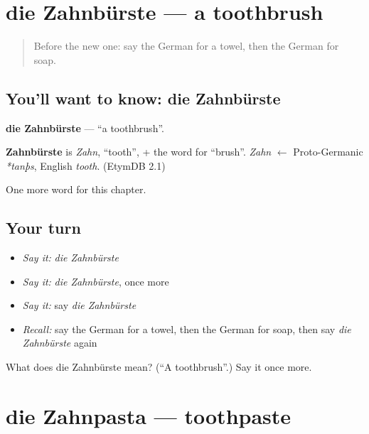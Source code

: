\section[die Zahnbürste]{die Zahnbürste — a toothbrush}

\label{lesson:GE-C114-zahnbuerste}



\begin{quote}
Before the new one: say the German for a towel, then the German for soap.
\end{quote}

\subsection*{You'll want to know: die Zahnbürste}
\textbf{die Zahnbürste} — \textquotedblleft{}a toothbrush\textquotedblright{}.

\begin{cousinweb}
\textbf{Zahnbürste} is \emph{Zahn}, \textquotedblleft{}tooth\textquotedblright{}, + the word for \textquotedblleft{}brush\textquotedblright{}. \emph{Zahn} $\leftarrow$ Proto-Germanic \emph{*tanþs}, English \emph{tooth}. (EtymDB 2.1)
\end{cousinweb}

\begin{grammarlens}[title={What you've built}]
One more word for this chapter.
\end{grammarlens}

\subsection*{Your turn}
\begin{itemize}
\raggedright
  \item \emph{Say it:} \emph{die Zahnbürste}
  \item \emph{Say it:} \emph{die Zahnbürste}, once more
  \item \emph{Say it:} say \emph{die Zahnbürste}
  \item \emph{Recall:} say the German for a towel, then the German for soap, then say \emph{die Zahnbürste} again
\end{itemize}

\begin{tcolorbox}[breakable,colback=teal!4,colframe=teal!35!black,title={Before you move on}]
What does die Zahnbürste mean? (\textquotedblleft{}A toothbrush\textquotedblright{}.) Say it once more.
\end{tcolorbox}
\section[die Zahnpasta]{die Zahnpasta — toothpaste}

